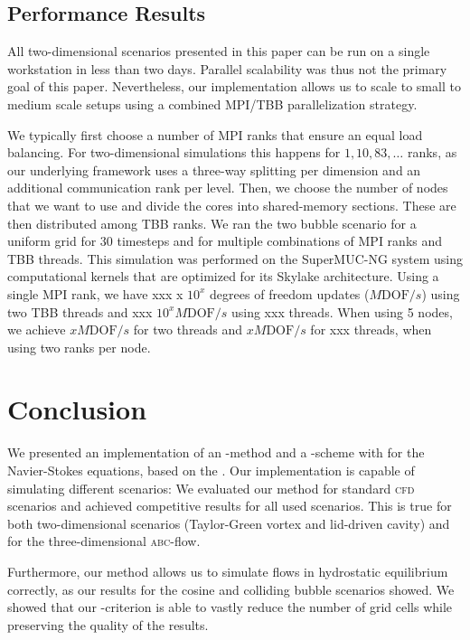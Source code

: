 \documentclass[runningheads]{llncs}
\begin{document}
\subsection{Performance Results}
All two-dimensional scenarios presented in this paper can be run on a single workstation in less than two days.
Parallel scalability was thus not the primary goal of this paper.
Nevertheless, our implementation allows us to scale to small to medium scale setups using a combined MPI/TBB parallelization strategy.

\newcommand{\mdofs}{M\text{DOF}/s}%
We typically first choose a number of MPI ranks that ensure an equal load balancing.
For two-dimensional simulations this happens for $1, 10, 83, \ldots$ ranks, as our underlying framework uses a three-way splitting per dimension and an additional communication rank per level.
Then, we choose the number of nodes that we want to use and divide the cores into shared-memory sections.
These are then distributed among TBB ranks.
We ran the two bubble scenario for a uniform grid for 30 timesteps and for multiple combinations of MPI ranks and TBB threads.
This simulation was performed on the SuperMUC-NG system using computational kernels that are optimized for its Skylake architecture.
Using a single MPI rank, we have xxx x $10^x$ degrees of freedom updates ($\mdofs$) using two TBB threads and xxx $10^x \mdofs$ using xxx threads.
When using 5 nodes, we achieve $x \mdofs$ for two threads and $x \mdofs$ for xxx threads, when using two ranks per node.

\section{Conclusion}
We presented an implementation of an \aderdg{}-method and a \muscl{}-scheme with \amr{} for the Navier-Stokes equations, based on the \exahypeengine.
Our implementation is capable of simulating different scenarios:
We evaluated our method for standard \textsc{cfd} scenarios and achieved competitive results for all used scenarios.
This is true for both two-dimensional scenarios (Taylor-Green vortex and lid-driven cavity) and for the three-dimensional \textsc{abc}-flow.

Furthermore, our method allows us to simulate flows in hydrostatic equilibrium correctly, as our results for the cosine and colliding bubble scenarios showed.
We showed that our \amr{}-criterion is able to vastly reduce the number of grid cells while preserving the quality of the results.
\end{document}
